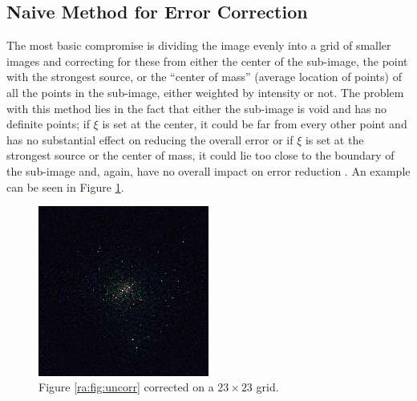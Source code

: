 \subsection{Naive Method for Error Correction}
The most basic compromise is dividing the image evenly into a grid of smaller images and correcting for these from either the center of the sub-image, the point with the strongest source, or the ``center of mass'' (average location of points) of all the points in the sub-image, either weighted by intensity or not. The problem with this method lies in the fact that either the sub-image is void and has no definite points; if $\xi$ is set at the center, it could be far from every other point and has no substantial effect on reducing the overall error or if $\xi$ is set at the strongest source or the center of mass, it could lie too close to the boundary of the sub-image and, again, have no overall impact on error reduction \citep{tasse2016tessellation}. An example can be seen in Figure \ref{ra:fig:cor23}.
%
\begin{figure}[H]
	\centering
	\includegraphics[width=0.5\textwidth]{Images/corrected-23x23.png}
	\caption{Figure \ref{ra:fig:uncorr} corrected on a $23\times23$ grid.}
	\label{ra:fig:cor23}
\end{figure}



